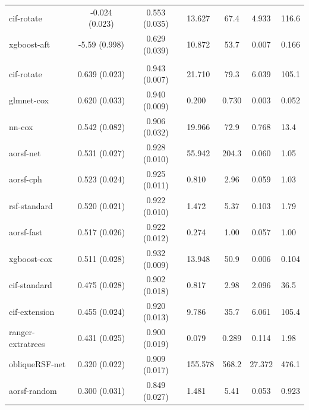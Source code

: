 \documentclass[twoside,11pt]{article}\usepackage[]{graphicx}\usepackage[]{xcolor}
\newenvironment{knitrout}{}{} %
\begin{document}
\begin{knitrout}
\begin{longtable}{lcclccl}
\hspace{1em}cif-rotate & -0.024 (0.023) & 0.553 (0.035) & 13.627 & 67.4 & 4.933 & 116.6\\
\hspace{1em}xgboost-aft & -5.59 (0.998) & 0.629 (0.039) & 10.872 & 53.7 & 0.007 & 0.166\\
\addlinespace[0.3em]
\hline
\multicolumn{7}{l}{\textit{\textbf{Movies released in 2015-2018; gross 1M USD, n = 551, p = 46}}}\\
\hline
\hspace{1em}cif-rotate & 0.639 (0.023) & 0.943 (0.007) & 21.710 & 79.3 & 6.039 & 105.1\\
\hspace{1em}glmnet-cox & 0.620 (0.033) & 0.940 (0.009) & 0.200 & 0.730 & 0.003 & 0.052\\
\hspace{1em}nn-cox & 0.542 (0.082) & 0.906 (0.032) & 19.966 & 72.9 & 0.768 & 13.4\\
\hspace{1em}aorsf-net & 0.531 (0.027) & 0.928 (0.010) & 55.942 & 204.3 & 0.060 & 1.05\\
\hspace{1em}aorsf-cph & 0.523 (0.024) & 0.925 (0.011) & 0.810 & 2.96 & 0.059 & 1.03\\
\hspace{1em}rsf-standard & 0.520 (0.021) & 0.922 (0.010) & 1.472 & 5.37 & 0.103 & 1.79\\
\hspace{1em}aorsf-fast & 0.517 (0.026) & 0.922 (0.012) & 0.274 & 1.00 & 0.057 & 1.00\\
\hspace{1em}xgboost-cox & 0.511 (0.028) & 0.932 (0.009) & 13.948 & 50.9 & 0.006 & 0.104\\
\hspace{1em}cif-standard & 0.475 (0.028) & 0.902 (0.018) & 0.817 & 2.98 & 2.096 & 36.5\\
\hspace{1em}cif-extension & 0.455 (0.024) & 0.920 (0.013) & 9.786 & 35.7 & 6.061 & 105.4\\
\hspace{1em}ranger-extratrees & 0.431 (0.025) & 0.900 (0.019) & 0.079 & 0.289 & 0.114 & 1.98\\
\hspace{1em}obliqueRSF-net & 0.320 (0.022) & 0.909 (0.017) & 155.578 & 568.2 & 27.372 & 476.1\\
\hspace{1em}aorsf-random & 0.300 (0.031) & 0.849 (0.027) & 1.481 & 5.41 & 0.053 & 0.923\\

\end{longtable}
\end{knitrout}
\end{document}
